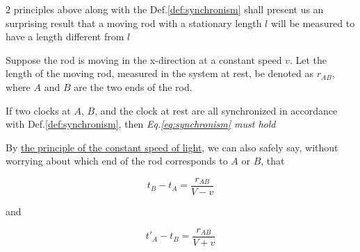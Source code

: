 
2 principles above along with the Def.\ref{def:synchronism} shall present us an surprising result that a moving rod
with a stationary length $l$ will be measured to have a length different from $l$

Suppose the rod is moving in the x-direction at a constant speed $v$. Let the length of the moving rod, measured in the
system at rest, be denoted as $r_{AB}$, where $A$ and $B$ are the two ends of the rod.

If two clocks at $A$, $B$, and the clock at rest are all synchronized in accordance with Def.\ref{def:synchronism},
then \textit{Eq.\ref{eq:synchronism} must hold}

By \hyperlink{constant-c-principle}{the principle of the constant speed of light}, we can also safely say, without
worrying about which end of the rod corresponds to $A$ or $B$, that

\[
    t_B - t_A = \frac{r_{AB}}{V - v}
\]

and

\[
    t'_A - t_B = \frac{r_{AB}}{V + v}
\]


